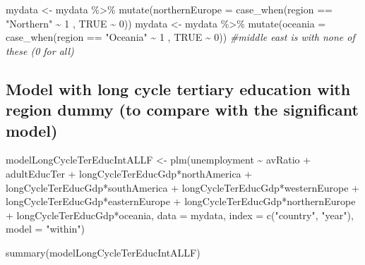 \documentclass[
]{article}
\newenvironment{Shaded}{\begin{snugshade}}{\end{snugshade}}
\newcommand{\AttributeTok}[1]{\textcolor[rgb]{0.77,0.63,0.00}{#1}}
\newcommand{\CommentTok}[1]{\textcolor[rgb]{0.56,0.35,0.01}{\textit{#1}}}
\newcommand{\ConstantTok}[1]{\textcolor[rgb]{0.00,0.00,0.00}{#1}}
\newcommand{\DecValTok}[1]{\textcolor[rgb]{0.00,0.00,0.81}{#1}}
\newcommand{\FunctionTok}[1]{\textcolor[rgb]{0.00,0.00,0.00}{#1}}
\newcommand{\NormalTok}[1]{#1}
\newcommand{\OtherTok}[1]{\textcolor[rgb]{0.56,0.35,0.01}{#1}}
\newcommand{\SpecialCharTok}[1]{\textcolor[rgb]{0.00,0.00,0.00}{#1}}
\newcommand{\StringTok}[1]{\textcolor[rgb]{0.31,0.60,0.02}{#1}}
\begin{document}
\begin{Shaded}
\begin{Highlighting}[]
\NormalTok{mydata }\OtherTok{\textless{}{-}}\NormalTok{ mydata }\SpecialCharTok{\%\textgreater{}\%} \FunctionTok{mutate}\NormalTok{(}\AttributeTok{northernEurope =} \FunctionTok{case\_when}\NormalTok{(region }\SpecialCharTok{==} \StringTok{"Northern"} \SpecialCharTok{\textasciitilde{}} \DecValTok{1}
\NormalTok{                                                      , }\ConstantTok{TRUE} \SpecialCharTok{\textasciitilde{}} \DecValTok{0}\NormalTok{))}
\NormalTok{mydata }\OtherTok{\textless{}{-}}\NormalTok{ mydata }\SpecialCharTok{\%\textgreater{}\%} \FunctionTok{mutate}\NormalTok{(}\AttributeTok{oceania =} \FunctionTok{case\_when}\NormalTok{(region }\SpecialCharTok{==} \StringTok{"Oceania"} \SpecialCharTok{\textasciitilde{}} \DecValTok{1}
\NormalTok{                                                      , }\ConstantTok{TRUE} \SpecialCharTok{\textasciitilde{}} \DecValTok{0}\NormalTok{))}
\CommentTok{\#middle east is with none of these (0 for all)}
\end{Highlighting}
\end{Shaded}

\hypertarget{model-with-long-cycle-tertiary-education-with-region-dummy-to-compare-with-the-significant-model}{%
\subsection{Model with long cycle tertiary education with region dummy
(to compare with the significant
model)}\label{model-with-long-cycle-tertiary-education-with-region-dummy-to-compare-with-the-significant-model}}

\begin{Shaded}
\begin{Highlighting}[]
\NormalTok{modelLongCycleTerEducIntALLF }\OtherTok{\textless{}{-}} \FunctionTok{plm}\NormalTok{(unemployment }\SpecialCharTok{\textasciitilde{}}\NormalTok{  avRatio }\SpecialCharTok{+}\NormalTok{ adultEducTer }\SpecialCharTok{+}\NormalTok{ longCycleTerEducGdp}\SpecialCharTok{*}\NormalTok{northAmerica }\SpecialCharTok{+}\NormalTok{ longCycleTerEducGdp}\SpecialCharTok{*}\NormalTok{southAmerica }\SpecialCharTok{+}\NormalTok{ longCycleTerEducGdp}\SpecialCharTok{*}\NormalTok{westernEurope }\SpecialCharTok{+}\NormalTok{ longCycleTerEducGdp}\SpecialCharTok{*}\NormalTok{easternEurope }\SpecialCharTok{+}\NormalTok{ longCycleTerEducGdp}\SpecialCharTok{*}\NormalTok{northernEurope }\SpecialCharTok{+}\NormalTok{ longCycleTerEducGdp}\SpecialCharTok{*}\NormalTok{oceania,}
             \AttributeTok{data =}\NormalTok{ mydata, }\AttributeTok{index =} \FunctionTok{c}\NormalTok{(}\StringTok{"country"}\NormalTok{, }\StringTok{"year"}\NormalTok{), }\AttributeTok{model =} \StringTok{"within"}\NormalTok{)}

\FunctionTok{summary}\NormalTok{(modelLongCycleTerEducIntALLF)}
\end{Highlighting}
\end{Shaded}
\end{document}
